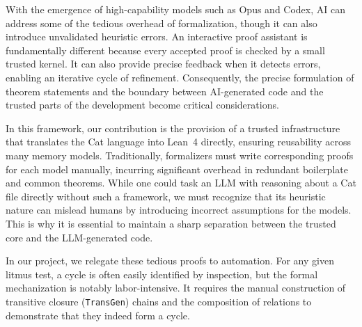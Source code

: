 With the emergence of high-capability models such as Opus and Codex, AI can address some of the tedious overhead of formalization, though it can also introduce unvalidated heuristic errors. An interactive proof assistant is fundamentally different because every accepted proof is checked by a small trusted kernel. It can also provide precise feedback when it detects errors, enabling an iterative cycle of refinement. Consequently, the precise formulation of theorem statements and the boundary between AI-generated code and the trusted parts of the development become critical considerations.

In this framework, our contribution is the provision of a trusted infrastructure that translates the Cat language into Lean~4 directly, ensuring reusability across many memory models. Traditionally, formalizers must write corresponding proofs for each model manually, incurring significant overhead in redundant boilerplate and common theorems. While one could task an LLM with reasoning about a Cat file directly without such a framework, we must recognize that its heuristic nature can mislead humans by introducing incorrect assumptions for the models. This is why it is essential to maintain a sharp separation between the trusted core and the LLM-generated code.

In our project, we relegate these tedious proofs to automation. For any given litmus test, a cycle is often easily identified by inspection, but the formal mechanization is notably labor-intensive. It requires the manual construction of transitive closure (\texttt{TransGen}) chains and the composition of relations to demonstrate that they indeed form a cycle.
